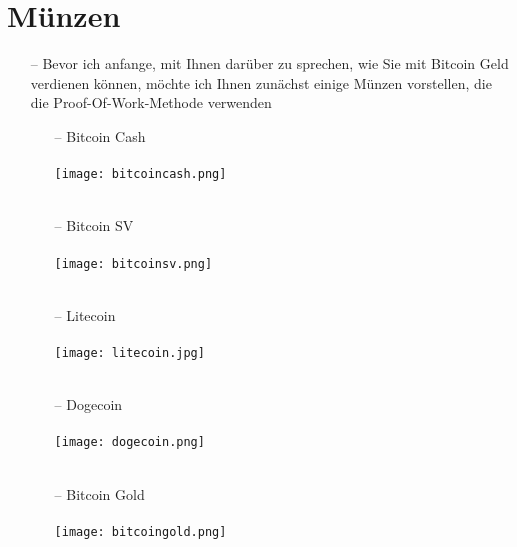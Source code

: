 \documentclass[ngerman]{scrreprt}
\begin{document}
\section{Münzen}

\begin{itemize}
	\item[--] Bevor ich anfange, mit Ihnen darüber zu sprechen, wie Sie mit Bitcoin Geld verdienen können, möchte ich Ihnen zunächst einige Münzen vorstellen, die die Proof-Of-Work-Methode verwenden
	\begin{itemize}
		\item [--] {Bitcoin Cash} \\ \\ 
		\texttt{[image: bitcoincash.png]}\\ \\
		
		\item [--] {Bitcoin SV} \\ \\
		\texttt{[image: bitcoinsv.png]}\\ \\
		\item [--] {Litecoin} \\ \\ 
		\texttt{[image: litecoin.jpg]} \\ \\
		\item [--] {Dogecoin} \\ \\
		\texttt{[image: dogecoin.png]}\\ \\
		\item [--] {Bitcoin Gold}\\ \\
		\texttt{[image: bitcoingold.png]}\\ \\



	\end{itemize}
	

\end{itemize}
\end{document}
